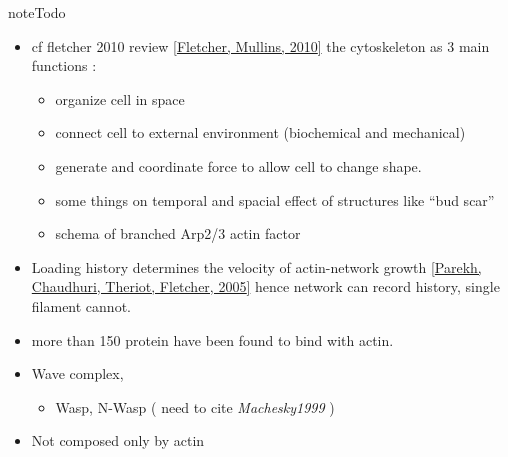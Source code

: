 \documentclass[A4paperpaper,11pt,english]{sphinxmanual}
\begin{document}
\begin{notice}{note}{Todo}
\begin{itemize}
\item {} 
cf fletcher 2010 review {\hyperref[bibitem:fletcher2010]{{[}Fletcher, Mullins,  2010{]}}} the cytoskeleton as 3 main
functions :
\begin{itemize}
\item {} 
organize cell in space

\item {} 
connect cell to external environment (biochemical and mechanical)

\item {} 
generate and coordinate force to allow cell to change shape.

\item {} 
some things on temporal and spacial effect of structures like ``bud scar''

\item {} 
schema of branched Arp2/3 actin factor

\end{itemize}

\item {} 
Loading history determines the velocity of actin-network growth
{\hyperref[bibitem:parekh2005]{{[}Parekh, Chaudhuri, Theriot, Fletcher,  2005{]}}} hence network can record history, single filament
cannot.

\item {} 
more than 150 protein have been found to bind with actin.

\item {} 
Wave complex,
\begin{itemize}
\item {} 
Wasp, N-Wasp ( need to cite \emph{Machesky1999} )

\end{itemize}

\item {} 
Not composed only by actin

\end{itemize}
\end{notice}
\end{document}

